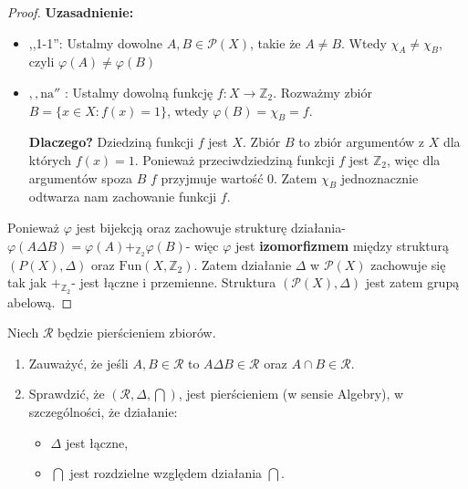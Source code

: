 \begin{proof}
	\textbf{Uzasadnienie:}
	\begin{itemize}
		\item ,,1-1'': Ustalmy dowolne $A,B \in \mathcal{P}(X) $, takie że $A\neq B$. Wtedy $\chi_{A} \neq \chi_{B}$, czyli $\varphi \left( A \right) \neq \varphi \left( B \right)   $
		\item $,,\text{na}''$ : Ustalmy dowolną funkcję $f: X \to \mathbb{Z} _{2}$. Rozważmy zbiór $B = \{x \in X: f\left( x \right)  = 1\} $, wtedy $\varphi (B) = \chi_{B} = f$.

			\textbf{Dlaczego?} Dziedziną funkcji $f$ jest $X$. Zbiór $B$ to zbiór argumentów z $X$ dla których $f(x) = 1$. Ponieważ przeciwdziedziną funkcji  $f$ jest $\mathbb{Z} _{2}$, więc dla argumentów spoza $B$ $f$ przyjmuje wartość 0. Zatem $\chi_{B}$ jednoznacznie odtwarza nam zachowanie funkcji $f$.
	\end{itemize}

	Ponieważ $\varphi  $ jest bijekcją oraz zachowuje strukturę działania- $\varphi \left( A\Delta B \right) = \varphi \left( A \right) +_{\scriptscriptstyle \mathbb{Z} _{2}}\varphi \left( B \right)$- więc $\varphi  $ jest \textbf{izomorfizmem} między strukturą $\left( P\left( X \right) , \Delta  \right) $ oraz $\text{Fun}\left( X, \mathbb{Z} _{2} \right) $. Zatem działanie $\Delta $ w $\mathcal{P}(X) $ zachowuje się tak jak $+_{\scriptscriptstyle \mathbb{Z} _{2}}$- jest łączne i przemienne. Struktura $\left( \mathcal{P}(X), \Delta \right) $ jest zatem grupą abelową. 
\end{proof} 
\begin{problem}[1.10.1]
	Niech $\mathcal{R}$ będzie pierścieniem zbiorów.
	\begin{enumerate}[label=\arabic*)]
		\item Zauważyć, że jeśli $A,B \in \mathcal{R}$ to $A\Delta B \in \mathcal{R}$ oraz $A\cap B\in \mathcal{R}$.
		\item Sprawdzić, że $\left( \mathcal{R},\Delta, \bigcap  \right) $, jest pierścieniem (w sensie Algebry), w szczególności, że działanie:
			\begin{itemize}
				\item $\Delta $ jest łączne,
				\item $\bigcap $ jest rozdzielne względem działania $\bigcap $.
			\end{itemize}
	\end{enumerate}
\end{problem} 
